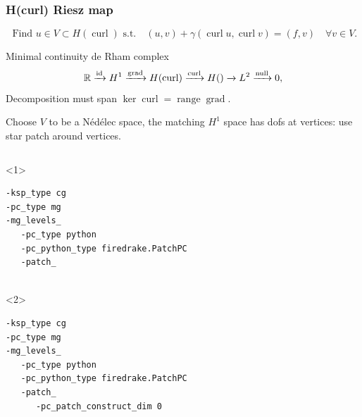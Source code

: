 \documentclass[presentation,aspectratio=43,10pt]{beamer}
\DeclareMathOperator{\grad}{grad}
\let\div\relax
\DeclareMathOperator{\div}{div}
\DeclareMathOperator{\curl}{curl}
\DeclareMathOperator{\range}{range}
\begin{document}
\begin{frame}[fragile]
  \frametitle{H(curl) Riesz map}
  \vspace{-1.5\baselineskip}
  \begin{equation*}
    \text{  Find $u \in V \subset H(\curl)$ s.t.} \quad (u, v) + \gamma (\curl u, \curl v) = (f, v) \quad \forall v \in V.
  \end{equation*}
  \vspace{-\baselineskip}
  \begin{block}{Minimal continuity de Rham complex}
    \begin{equation*}
      \mathbb{R} \xrightarrow{\operatorname{id}} H^1 \xrightarrow{\grad} H(\curl)
      \xrightarrow{\curl} H(\div) \xrightarrow{\div} L^2 \xrightarrow{\operatorname{null}} 0,
    \end{equation*}
    Decomposition must span $\ker \curl = \range \grad$.

    Choose $V$ to be a N\'ed\'elec space, the matching $H^1$
    space has dofs at vertices: use star patch around vertices.
  \end{block}
  \begin{columns}
    \begin{column}{0.6\textwidth}
      \begin{onlyenv}<1>
\begin{verbatim}
-ksp_type cg
-pc_type mg
-mg_levels_
   -pc_type python
   -pc_python_type firedrake.PatchPC
   -patch_


\end{verbatim}
      \end{onlyenv}
      \begin{onlyenv}<2>
\begin{verbatim}
-ksp_type cg
-pc_type mg
-mg_levels_
   -pc_type python
   -pc_python_type firedrake.PatchPC
   -patch_
      -pc_patch_construct_dim 0


\end{verbatim}
\end{onlyenv}
\end{column}
\end{columns}
\end{frame}
\end{document}
